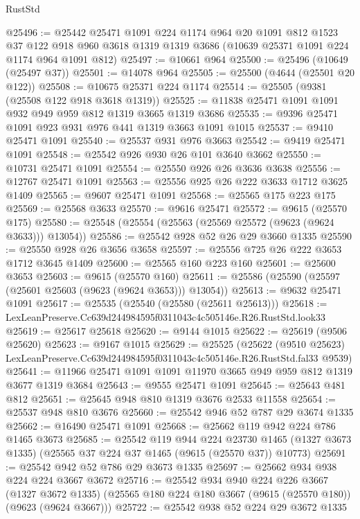 \begin{lexlean}{RustStd}
\begin{coremodule}
@25496 := @25442
    @25471
    @1091
    @224
    @1174
    @964
    @20
    @1091
    @812
    @1523
    @37
    @122
    @918
    @960
    @3618
    @1319
    @1319
    @3686
    (@10639 @25371 @1091 @224 @1174 @964 @1091 @812)
@25497 := @10661 @964
@25500 := @25496 (@10649 (@25497 @37))
@25501 := @14078 @964
@25505 := @25500 (@4644 (@25501 @20 @122))
@25508 := @10675 @25371 @224 @1174
@25514 := @25505 (@9381 (@25508 @122 @918 @3618 @1319))
@25525 := @11838 @25471 @1091 @1091 @932 @949 @959 @812 @1319 @3665 @1319 @3686
@25535 := @9396 @25471 @1091 @923 @931 @976 @441 @1319 @3663 @1091 @1015
@25537 := @9410 @25471 @1091
@25540 := @25537 @931 @976 @3663
@25542 := @9419 @25471 @1091
@25548 := @25542 @926 @930 @26 @101 @3640 @3662
@25550 := @10731 @25471 @1091
@25554 := @25550 @926 @26 @3636 @3638
@25556 := @12767 @25471 @1091
@25563 := @25556 @925 @26 @222 @3633 @1712 @3625 @1409
@25565 := @9607 @25471 @1091
@25568 := @25565 @175 @223 @175
@25569 := @25568 @3633
@25570 := @9616 @25471
@25572 := @9615 (@25570 @175)
@25580 := @25548 (@25554 (@25563 (@25569 @25572 (@9623 (@9624 @3633))) @13054))
@25586 := @25542 @928 @52 @26 @29 @3660 @1335
@25590 := @25550 @928 @26 @3656 @3658
@25597 := @25556 @725 @26 @222 @3653 @1712 @3645 @1409
@25600 := @25565 @160 @223 @160
@25601 := @25600 @3653
@25603 := @9615 (@25570 @160)
@25611 := @25586 (@25590 (@25597 (@25601 @25603 (@9623 (@9624 @3653))) @13054))
@25613 := @9632 @25471 @1091
@25617 := @25535 (@25540 (@25580 (@25611 @25613)))
@25618 := LexLeanPreserve.Cc639d244984595f0311043c4c505146e.R26.RustStd.look33
@25619 := @25617 @25618
@25620 := @9144 @1015
@25622 := @25619 (@9506 @25620)
@25623 := @9167 @1015
@25629 := @25525
    (@25622
      (@9510 @25623)
      LexLeanPreserve.Cc639d244984595f0311043c4c505146e.R26.RustStd.fal33
      @9539)
@25641 := @11966 @25471 @1091 @1091 @11970 @3665 @949 @959 @812 @1319 @3677 @1319 @3684
@25643 := @9555 @25471 @1091
@25645 := @25643 @481 @812
@25651 := @25645 @948 @810 @1319 @3676 @2533 @11558
@25654 := @25537 @948 @810 @3676
@25660 := @25542 @946 @52 @787 @29 @3674 @1335
@25662 := @16490 @25471 @1091
@25668 := @25662 @119 @942 @224 @786 @1465 @3673
@25685 := @25542
    @119
    @944
    @224
    @23730
    @1465
    (@1327 @3673 @1335)
    (@25565 @37 @224 @37 @1465 (@9615 (@25570 @37)) @10773)
@25691 := @25542 @942 @52 @786 @29 @3673 @1335
@25697 := @25662 @934 @938 @224 @224 @3667 @3672
@25716 := @25542
    @934
    @940
    @224
    @226
    @3667
    (@1327 @3672 @1335)
    (@25565 @180 @224 @180 @3667 (@9615 (@25570 @180)) (@9623 (@9624 @3667)))
@25722 := @25542 @938 @52 @224 @29 @3672 @1335

\end{coremodule}
\end{lexlean}

